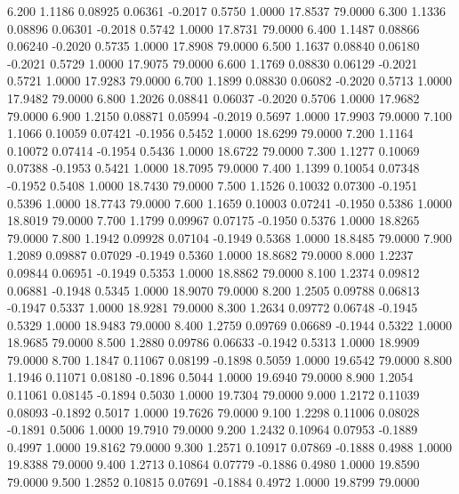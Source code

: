    6.200   1.1186   0.08925   0.06361  -0.2017   0.5750   1.0000  17.8537  79.0000
   6.300   1.1336   0.08896   0.06301  -0.2018   0.5742   1.0000  17.8731  79.0000
   6.400   1.1487   0.08866   0.06240  -0.2020   0.5735   1.0000  17.8908  79.0000
   6.500   1.1637   0.08840   0.06180  -0.2021   0.5729   1.0000  17.9075  79.0000
   6.600   1.1769   0.08830   0.06129  -0.2021   0.5721   1.0000  17.9283  79.0000
   6.700   1.1899   0.08830   0.06082  -0.2020   0.5713   1.0000  17.9482  79.0000
   6.800   1.2026   0.08841   0.06037  -0.2020   0.5706   1.0000  17.9682  79.0000
   6.900   1.2150   0.08871   0.05994  -0.2019   0.5697   1.0000  17.9903  79.0000
   7.100   1.1066   0.10059   0.07421  -0.1956   0.5452   1.0000  18.6299  79.0000
   7.200   1.1164   0.10072   0.07414  -0.1954   0.5436   1.0000  18.6722  79.0000
   7.300   1.1277   0.10069   0.07388  -0.1953   0.5421   1.0000  18.7095  79.0000
   7.400   1.1399   0.10054   0.07348  -0.1952   0.5408   1.0000  18.7430  79.0000
   7.500   1.1526   0.10032   0.07300  -0.1951   0.5396   1.0000  18.7743  79.0000
   7.600   1.1659   0.10003   0.07241  -0.1950   0.5386   1.0000  18.8019  79.0000
   7.700   1.1799   0.09967   0.07175  -0.1950   0.5376   1.0000  18.8265  79.0000
   7.800   1.1942   0.09928   0.07104  -0.1949   0.5368   1.0000  18.8485  79.0000
   7.900   1.2089   0.09887   0.07029  -0.1949   0.5360   1.0000  18.8682  79.0000
   8.000   1.2237   0.09844   0.06951  -0.1949   0.5353   1.0000  18.8862  79.0000
   8.100   1.2374   0.09812   0.06881  -0.1948   0.5345   1.0000  18.9070  79.0000
   8.200   1.2505   0.09788   0.06813  -0.1947   0.5337   1.0000  18.9281  79.0000
   8.300   1.2634   0.09772   0.06748  -0.1945   0.5329   1.0000  18.9483  79.0000
   8.400   1.2759   0.09769   0.06689  -0.1944   0.5322   1.0000  18.9685  79.0000
   8.500   1.2880   0.09786   0.06633  -0.1942   0.5313   1.0000  18.9909  79.0000
   8.700   1.1847   0.11067   0.08199  -0.1898   0.5059   1.0000  19.6542  79.0000
   8.800   1.1946   0.11071   0.08180  -0.1896   0.5044   1.0000  19.6940  79.0000
   8.900   1.2054   0.11061   0.08145  -0.1894   0.5030   1.0000  19.7304  79.0000
   9.000   1.2172   0.11039   0.08093  -0.1892   0.5017   1.0000  19.7626  79.0000
   9.100   1.2298   0.11006   0.08028  -0.1891   0.5006   1.0000  19.7910  79.0000
   9.200   1.2432   0.10964   0.07953  -0.1889   0.4997   1.0000  19.8162  79.0000
   9.300   1.2571   0.10917   0.07869  -0.1888   0.4988   1.0000  19.8388  79.0000
   9.400   1.2713   0.10864   0.07779  -0.1886   0.4980   1.0000  19.8590  79.0000
   9.500   1.2852   0.10815   0.07691  -0.1884   0.4972   1.0000  19.8799  79.0000
